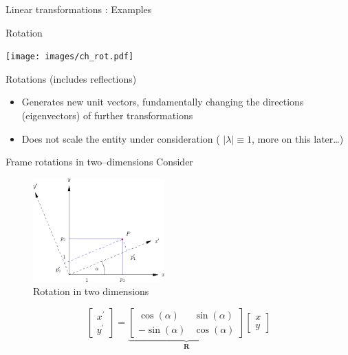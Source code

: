 \documentclass[notes]{beamer}
\newcommand{\bv}[1]{\ensuremath{\mathbf{#1}}}
\newcommand{\abs}[1]{\left\lvert#1\right\rvert}
\begin{document}
\begin{frame}[label={sec:orga18c9eb}]{Linear transformations : Examples}
\begin{block}{Rotation}
\begin{center}
\spot<2>{\( \bv{M} =\begin{bmatrix}\cos(\theta )&\sin(\theta )&0\\-\sin(\theta
 )&\cos(\theta )&0\\0&0&1\end{bmatrix} \text{with } \theta = \frac{\pi}{6}\)}
\end{center}

\begin{center}
\texttt{[image: images/ch\_rot.pdf]}
\end{center}
\end{block}
\end{frame}
\begin{frame}[label={sec:org07ea7cd}]{Rotations (includes reflections)}
\begin{itemize}
\item Generates new unit vectors, fundamentally changing the directions
(eigenvectors) of further transformations
\item Does not scale the entity under consideration ( \(\abs{\lambda} \equiv  1\), more on this later\ldots{})
\end{itemize}
\end{frame}
\begin{frame}[label={sec:org79228d4}]{Frame rotations in two--dimensions}
Consider
\begin{figure}[htbp]
\centering
\includegraphics[width=0.45\textwidth]{images/cartesian_rotation.png}
\caption{Rotation in two dimensions}
\end{figure}

\[ \begin{bmatrix} x^\prime \\ y^\prime \end{bmatrix}
   = \underbrace{\begin{bmatrix}\cos(\alpha )&\sin(\alpha )\\ -\sin(\alpha
   )&\cos(\alpha )\end{bmatrix}}_{\bv{R}} \begin{bmatrix} x\\ y\end{bmatrix}\]
\end{frame}
\end{document}
